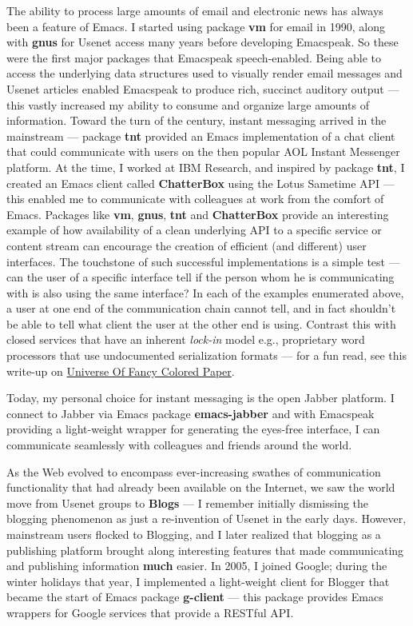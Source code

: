 \documentclass[11pt]{article}
\begin{document}
The ability to process large amounts of email and electronic news
has always been a feature of Emacs. I started using package \textbf{vm}
for email in 1990, along with \textbf{gnus} for Usenet access many years
before developing Emacspeak. So these were the first major
packages that Emacspeak speech-enabled. Being able to access the
underlying data structures used to visually render email messages
and Usenet articles enabled Emacspeak to produce rich, succinct
auditory output — this vastly increased my ability to consume and
organize large amounts of information. Toward the turn of the
century, instant messaging arrived in the mainstream — package
\textbf{tnt} provided an Emacs implementation of a chat client that
could communicate with users on the then popular AOL Instant
Messenger platform. At the time, I worked at IBM Research, and
inspired by package \textbf{tnt}, I created an Emacs client called
\textbf{ChatterBox} using the Lotus Sametime API — this enabled me to
communicate with colleagues at work from the comfort of
Emacs. Packages like \textbf{vm}, \textbf{gnus}, \textbf{tnt} and \textbf{ChatterBox} provide
an interesting example of how availability of a clean underlying
API to a specific service or content stream can encourage the
creation of efficient (and different) user interfaces. The
touchstone of such successful implementations is a simple test —
can the user of a specific interface tell if the person whom he
is communicating with is also using the same interface? In each
of the examples enumerated above, a user at one end of the
communication chain cannot tell, and in fact shouldn't be able to
tell what client the user at the other end is using. Contrast
this with closed services that have an inherent \emph{lock-in} model
e.g., proprietary word processors that use undocumented
serialization formats — for a fun read, see this write-up on
\href{http://emacspeak.sourceforge.net/publications/colored-paper.html}{Universe Of Fancy Colored Paper}.


Today, my personal choice for instant messaging is the open
Jabber platform. I connect to Jabber via Emacs package
\textbf{emacs-jabber} and with Emacspeak providing a light-weight
wrapper for generating the eyes-free interface, I can communicate
seamlessly with colleagues and friends around the world.

As the Web evolved to encompass ever-increasing swathes of
communication functionality that had already been available on
the Internet, we saw the world move from Usenet groups to \textbf{Blogs}
— I remember initially dismissing the blogging phenomenon as just
a re-invention of Usenet in the early days. However, mainstream
users flocked to Blogging, and I later realized that blogging as
a publishing platform brought along interesting features that
made communicating and publishing information \textbf{much} easier. In
2005, I joined Google; during the winter holidays that year, I
implemented a light-weight client for Blogger that became the
start of Emacs package \textbf{g-client} — this package provides Emacs
wrappers for Google services that provide a RESTful API.
\end{document}

